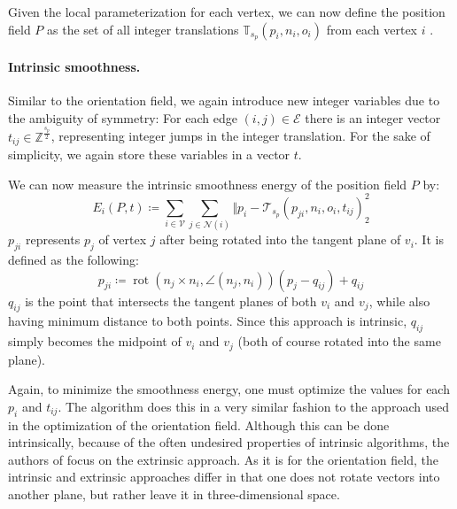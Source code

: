 \documentclass{ACGSeminar}
\DeclareMathOperator{\rot}{rot}
\begin{document}
Given the local parameterization for each vertex, we can now define the position field $P$ as the set of all integer translations $\mathbb{T}_{s_p}(p_i, n_i, o_i)$ from each vertex $i$ \cite{jakob2015instant}.

\paragraph{Intrinsic smoothness.}
Similar to the orientation field, we again introduce new integer variables due to the ambiguity of symmetry: For each edge $(i,j) \in \mathcal{E}$ there is an integer vector $t_{ij} \in \mathbb{Z}^{\frac{s_p}{2}}$, representing integer jumps in the integer translation. For the sake of simplicity, we again store these variables in a vector $t$.\bigskip

We can now measure the intrinsic smoothness energy of the position field $P$ by:
\begin{equation*}
	E_i(P,t) \coloneqq \sum_{i \in \mathcal{V}} \sum_{j \in \mathcal{N}(i)} \Vert p_i - \mathcal{T}_{s_p}(p_{ji}, n_i, o_i, t_{ij})^2_2
\end{equation*}
$p_{ji}$ represents $p_j$ of vertex $j$ after being rotated into the tangent plane of $v_i$. It is defined as the following:
\begin{equation*}
	p_{ji} \coloneqq \rot(n_j \times n_i, \angle(n_j, n_i)) (p_j - q_{ij}) + q_{ij}
\end{equation*}
$q_{ij}$ is the point that intersects the tangent planes of both $v_i$ and $v_j$, while also having minimum distance to both points. Since this approach is intrinsic, $q_{ij}$ simply becomes the midpoint of $v_i$ and $v_j$ (both of course rotated into the same plane).\bigskip

Again, to minimize the smoothness energy, one must optimize the values for each $p_i$ and $t_{ij}$. The algorithm does this in a very similar fashion to the approach used in the optimization of the orientation field. Although this can be done intrinsically, because of the often undesired properties of intrinsic algorithms, the authors of \cite{jakob2015instant} focus on the extrinsic approach. As it is for the orientation field, the intrinsic and extrinsic approaches differ in that one does not rotate vectors into another plane, but rather leave it in three-dimensional space.
\end{document}
